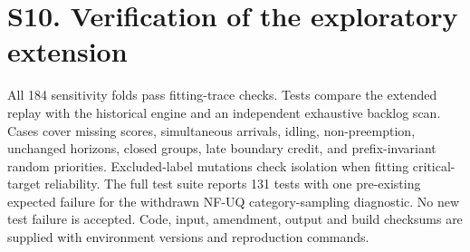 \begin{tableorg}[htbp]
\centering\small
\caption{Raw-alert starts on the same five forward-eligible scenarios at 12/h. Each cell is LOSO / forward fitting. Both designs have 7,477 starts per ranker.}
\label{tab:s-forward-starts}

\end{tableorg}
\begin{tableorg}[htbp]
\centering\small
\caption{Randomized raw-alert starts at 12/h. Means over 100 seed totals across eight scenarios; each seed has 11,508 starts per ranker.}
\label{tab:s-random-starts}

\end{tableorg}
\begin{tableorg}[htbp]
\centering\small
\caption{Investigation-start partition for 60-second groups at 12 groups/h.}
\label{tab:s-group-starts60}

\end{tableorg}
\begin{tableorg}[htbp]
\centering\small
\caption{Investigation-start partition for 300-second groups at 12 groups/h.}
\label{tab:s-group-starts300}

\end{tableorg}
\begin{tableorg}[htbp]
\centering\small
\caption{Investigation-start partition for 900-second groups at 12 groups/h.}
\label{tab:s-group-starts900}

\end{tableorg}
\FloatBarrier
\section*{S10. Verification of the exploratory extension}
All 184 sensitivity folds pass fitting-trace checks. Tests compare the extended replay with the historical engine and an independent exhaustive backlog scan. Cases cover missing scores, simultaneous arrivals, idling, non-preemption, unchanged horizons, closed groups, late boundary credit, and prefix-invariant random priorities. Excluded-label mutations check isolation when fitting critical-target reliability. The full test suite reports 131 tests with one pre-existing expected failure for the withdrawn NF-UQ category-sampling diagnostic. No new test failure is accepted. Code, input, amendment, output and build checksums are supplied with environment versions and reproduction commands.

